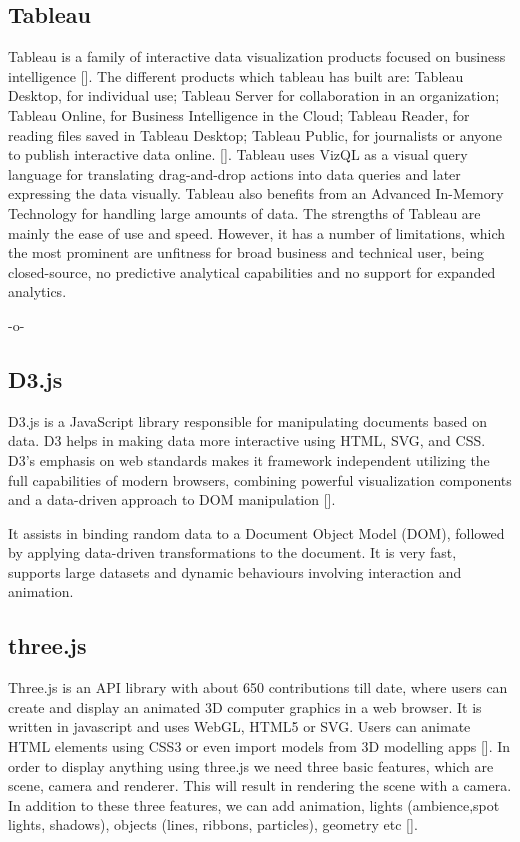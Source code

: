\subsection{Tableau}

Tableau is a family of interactive data visualization products focused
on business intelligence [\cite{www-tableau-tutorial}]. The different
products which tableau has built are: Tableau Desktop, for individual
use; Tableau Server for collaboration in an organization; Tableau
Online, for Business Intelligence in the Cloud; Tableau Reader, for
reading files saved in Tableau Desktop; Tableau Public, for
journalists or anyone to publish interactive data
online. [\cite{www-tableau-web}]. Tableau uses VizQL as a visual query
language for translating drag-and-drop actions into data queries and
later expressing the data visually. Tableau also benefits from an
Advanced In-Memory Technology for handling large amounts of data.  The
strengths of Tableau are mainly the ease of use and speed.  However,
it has a number of limitations, which the most prominent are unfitness
for broad business and technical user, being closed-source, no
predictive analytical capabilities and no support for expanded
analytics.

-o-

\subsection{D3.js}

D3.js is a JavaScript library responsible for manipulating documents
based on data. D3 helps in making data more interactive using HTML,
SVG, and CSS. D3's emphasis on web standards makes it framework
independent utilizing the full capabilities of modern browsers,
combining powerful visualization components and a data-driven approach
to DOM manipulation [\cite{www-d3}].

It assists in binding random data to a Document Object Model (DOM),
followed by applying data-driven transformations to the document. It
is very fast, supports large datasets and dynamic behaviours involving
interaction and animation.

    
\subsection{three.js}

Three.js is an API library with about 650 contributions till date,
where users can create and display an animated 3D computer graphics in
a web browser. It is written in javascript and uses WebGL, HTML5 or
SVG. Users can animate HTML elements using CSS3 or even import models
from 3D modelling apps [\cite{www-threejs-wiki}]. In order to display
anything using three.js we need three basic features, which are scene,
camera and renderer. This will result in rendering the scene with a
camera. In addition to these three features, we can add animation,
lights (ambience,spot lights, shadows), objects (lines, ribbons,
particles), geometry etc [\cite{www-threejs-webpage}].
    
